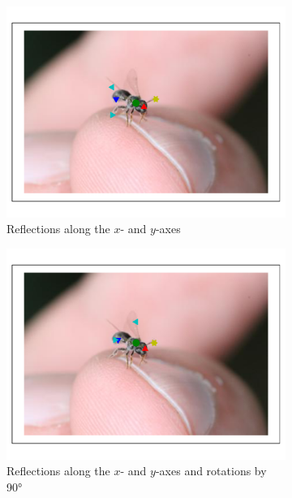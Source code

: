 \documentclass[11pt, oneside]{report}
\begin{document}
\begin{figure}[p]
\begin{subfigure}[b]{0.45\textwidth}
                \centering
                \includegraphics[width=\textwidth]{2refl_2.pdf}
                \caption{Reflections along the $x$- and $y$-axes\\\hspace{0pt}}
            \end{subfigure}
            \begin{subfigure}[b]{0.45\textwidth}
                \centering
                \includegraphics[width=\textwidth]{2reflrot_2.pdf}
                \caption{Reflections along the $x$- and $y$-axes and rotations by 90°}
            \end{subfigure}
            \begin{subfigure}[b]{0.45\textwidth}

\end{subfigure}
\end{figure}
\end{document}
